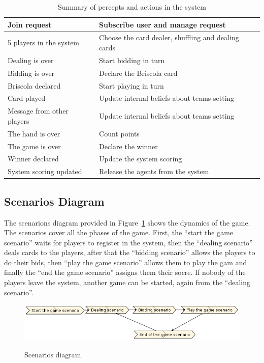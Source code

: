 \documentclass[a4paper]{article}
\begin{document}
\begin{table}[htp]
  \begin{tabular}{|l|l|}
    \hline
    Join request	& Subscribe user and manage request  \\
    \hline
    5 players in the system	& Choose the card dealer, shuffling and dealing cards  \\
    \hline
    Dealing is over	& Start bidding in turn \\
    \hline
    Bidding is over	& Declare the Briscola card \\ 
    \hline
    Briscola declared	& Start playing in turn \\
    \hline
    Card played	& Update internal beliefs about teams setting \\
    \hline
    Message from other players & Update internal beliefs about teams setting \\
    \hline
    The hand is over	& Count points \\
    \hline
    The game is over	& Declare the winner \\
    \hline
    Winner declared	 & Update the system scoring \\
    \hline
    System scoring updated	& Release the agents from the system \\
    \hline
  \end{tabular}
  \label{table:inout}
  \caption{Summary of percepts and actions in the system}
\end{table}

\subsection{Scenarios Diagram}

The scenarions diagram provided in Figure~\ref{fig:scenarios} shows the dynamics of the game. The scenarios cover all the phases of the game. First, the ``start the game scenario'' waits for players to register in the system, then the ``dealing scenario'' deals cards to the players, after that the ``bidding scenario'' allows the players to do their bids, then ``play the game scenario'' allows them to play the gam and finally the ``end the game scenario'' assigns them their socre. If nobody of the players leave the system, another game can be started, again from the ``dealing scenario''.

\begin{figure}[htp]
  \includegraphics[keepaspectratio,scale=0.5]{pdt/images/system_specification/scenarios.png}
  \label{fig:scenarios}
  \caption{Scenarios diagram}
\end{figure}
\end{document}
